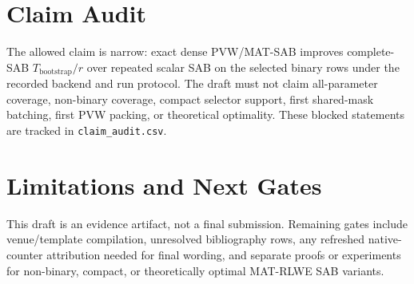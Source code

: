 \documentclass{article}
\begin{document}
\section{Claim Audit}
The allowed claim is narrow: exact dense PVW/MAT-SAB improves complete-SAB
$T_{\mathrm{bootstrap}}/r$ over repeated scalar SAB on the selected binary
rows under the recorded backend and run protocol. The draft must not claim
all-parameter coverage, non-binary coverage, compact selector support, first
shared-mask batching, first PVW packing, or theoretical optimality. These
blocked statements are tracked in \texttt{claim\_audit.csv}.

\section{Limitations and Next Gates}
This draft is an evidence artifact, not a final submission. Remaining gates
include venue/template compilation, unresolved bibliography rows, any refreshed
native-counter attribution needed for final wording, and separate proofs or
experiments for non-binary, compact, or theoretically optimal MAT-RLWE SAB
variants.



\end{document}

